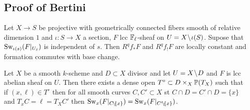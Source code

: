 \documentclass[12pt]{article}
\begin{document}
\subsection{Proof of Bertini}

\begin{theorem}
Let $X \to S$ be projective with geometrically connected fibers smooth of relative dimension $1$ and $\iota : S \to X$ a section, $F$ lcc $\FF_\ell$-sheaf on $U = X \sm \iota(S)$. Supose that $\Sw_{\iota(s)}(F|_{U_{\bar{s}}})$ is independent of $s$. Then $R^q f_* F$ and $R^q f_! F$ are locally constant and formation commutes with base change. 
\end{theorem}

\begin{prop}
Let $X$ be a smooth $k$-scheme and $D \subset X$ divisor and let $U = X \sm D$ and $F$ is lcc abelian sheaf on $U$. Then there exists a dense open $T^\circ \subset D \times_X \P(T_X)$ such that if $(x, \ell) \in T^\circ$ then for all smooth curves $C, C' \subset X$ st $C \cap D = C' \cap D = \{ x \}$ and $T_x C = \ell = T_X C'$ then $\Sw_x(F|_{C \sm \{ x \}}) = \Sw_x(F|_{C'\sm \{ x \}})$. 
\end{prop}
\end{document}
